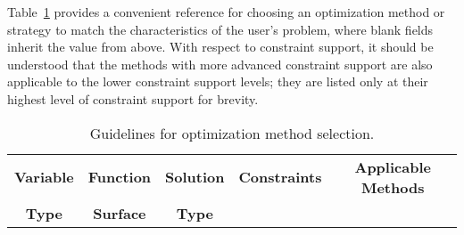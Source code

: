 Table~\ref{usage:guideopt} provides a convenient reference for
choosing an optimization method or strategy to match the
characteristics of the user's problem, where blank fields inherit the
value from above. With respect to constraint support, it should be
understood that the methods with more advanced constraint support are
also applicable to the lower constraint support levels; they are
listed only at their highest level of constraint support for brevity.

\begin{table}
\centering
\caption{Guidelines for optimization method selection.}
\label{usage:guideopt}\vspace{2mm}
\begin{tabular}{|c|c|c|c|c|}
\hline
\textbf{Variable} & \textbf{Function} & \textbf{Solution} &
\textbf{Constraints} & \textbf{Applicable Methods} \\
\textbf{Type} & \textbf{Surface} & \textbf{Type} & & \\


\end{tabular}
\end{table}
